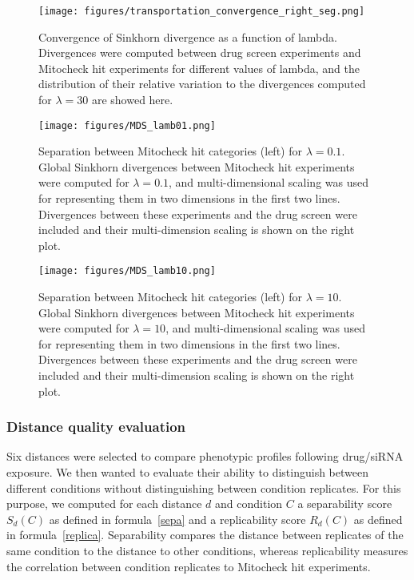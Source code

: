 \begin{figure*}[ht!]
\centerline{\texttt{[image: figures/transportation\_convergence\_right\_seg.png]}
}
\caption{Convergence of Sinkhorn divergence as a function of lambda. Divergences were computed between drug screen experiments and Mitocheck hit experiments for different values of lambda, and the distribution of their relative variation to the divergences computed for $\lambda=30$ are showed here.}
\label{lambda_choice1}
\end{figure*}
\begin{figure*}[ht!]
\centerline{
\texttt{[image: figures/MDS\_lamb01.png]}
}
\caption{Separation between Mitocheck hit categories (left) for $\lambda=0.1$. Global Sinkhorn divergences between Mitocheck hit experiments were computed for $\lambda=0.1$, and multi-dimensional scaling was used for representing them in two dimensions in the first two lines. Divergences between these experiments and the drug screen were included and their multi-dimension scaling is shown on the right plot.}
\label{lambda_choice_2}
\end{figure*}
\begin{figure*}[ht!]
\centerline{
\texttt{[image: figures/MDS\_lamb10.png]}}
\caption{Separation between Mitocheck hit categories (left) for $\lambda=10$. Global Sinkhorn divergences between Mitocheck hit experiments were computed for $\lambda=10$, and multi-dimensional scaling was used for representing them in two dimensions in the first two lines. Divergences between these experiments and the drug screen were included and their multi-dimension scaling is shown on the right plot.}
\label{lambda_choice_3}
\end{figure*}

\subsubsection{Distance quality evaluation}
Six distances were selected to compare phenotypic profiles following drug/siRNA exposure. We then wanted to evaluate their ability to distinguish between different conditions without distinguishing between condition replicates. For this purpose, we computed for each distance $d$ and condition $C$ a separability score $S_d(C)$ as defined in formula~\ref{sepa} and a replicability score $R_d(C)$ as defined in formula~\ref{replica}. Separability compares the distance between replicates of the same condition to the distance to other conditions, whereas replicability measures the correlation between condition replicates to Mitocheck hit experiments.

